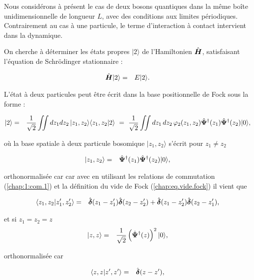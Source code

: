 Nous considérons à présent le cas de deux bosons quantiques dans la même boîte unidimensionnelle de longueur \(L\), avec des conditions aux limites périodiques. Contrairement au cas à une particule, le terme d’interaction à contact intervient dans la dynamique.

On cherche à déterminer les états propres \(\vert 2 \rangle\) de l’Hamiltonien \(\hat{\bm{H}}\), satisfaisant l’équation de Schrödinger stationnaire :

\begin{eqnarray}
	\hat{\bm{H}} \vert 2 \rangle & = & E \vert 2 \rangle.
\end{eqnarray}


L’état à deux particules peut être écrit dans la base positionnelle de Fock sous la forme :

\begin{eqnarray}
	\vert 2 \rangle & = & \frac{1}{\sqrt{2}}\iint dz_1dz_2 \, \vert z_1 , z_2 \rangle \langle z_1 , z_2  \vert 2  \rangle ~=~\frac{1}{\sqrt{2}} \iint dz_1\,dz_2 \, \varphi_2(z_1, z_2) \hat{\bm{\Psi}}^\dag(z_1) \hat{\bm{\Psi}}^\dag(z_2) \vert 0 \rangle, \label{chap:1:2.part}
\end{eqnarray}

où la base spatiale à deux particule bosomique $\vert z_1 , z_2 \rangle$ s'écrit pour $z_1 \neq  z_2$

\begin{eqnarray}
	\vert z_1 , z_2 \rangle  & = &  \hat{\bm{\Psi}}^\dag(z_1) \hat{\bm{\Psi}}^\dag(z_2) \vert 0 \rangle ,
\end{eqnarray}

orthonormalisée car car avec en utilisant les relations de commutation (\ref{chap:1:com.1})  et la définition du vide de Fock (\ref{chap:eq.vide.fock}) il vient que 

\begin{eqnarray}
	\langle z_1 , z_2 \vert z_1' , z_2' \rangle  & = & \hat{\bm{\delta}}(z_1 -z_1')\hat{\bm{\delta}}(z_2 -z_2')  +   \hat{\bm{\delta}}(z_1 -z_2')\hat{\bm{\delta}}(z_2 -z_1'),
\end{eqnarray}

et si $z_1 =  z_2 = z$
\begin{eqnarray}
	\vert z , z \rangle  & = &  \frac{1}{\sqrt{2}} \left(\hat{\bm{\Psi}}^\dag(z)\right)^2  \vert 0 \rangle ,
\end{eqnarray}

orthonormalisée car 

\begin{eqnarray}
	\langle z , z \vert z' , z' \rangle  & = & \hat{\bm{\delta}}(z -z'),
\end{eqnarray}


